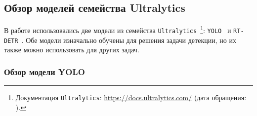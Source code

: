 

\subsection{Обзор моделей семейства Ultralytics}

В работе использовались две модели из семейства \texttt{Ultralytics}~\footnote{Документация \texttt{Ultralytics}: \url{https://docs.ultralytics.com/} (дата обращения: ).}:
\texttt{YOLO}~\cite{redmon2016yolo} и \texttt{RT-DETR}~\cite{zhao2024rtdetr}.
Обе модели изначально обучены для решения задачи детекции, но их также можно использовать для других задач.

\subsubsection{Обзор модели YOLO}

